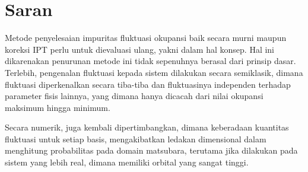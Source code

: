 \section{Saran}

Metode penyelesaian impuritas fluktuasi okupansi baik secara murni maupun koreksi IPT perlu untuk dievaluasi ulang, yakni dalam hal konsep. Hal ini dikarenakan penurunan metode ini tidak sepenuhnya berasal dari prinsip dasar. Terlebih, pengenalan fluktuasi kepada sistem dilakukan secara semiklasik, dimana fluktuasi diperkenalkan secara tiba-tiba dan fluktuasinya independen terhadap parameter fisis lainnya, yang dimana hanya dicacah dari nilai okupansi maksimum hingga minimum.

Secara numerik, juga kembali dipertimbangkan, dimana keberadaan kuantitas fluktuasi untuk setiap basis, mengakibatkan ledakan dimensional dalam menghitung probabilitas pada domain matsubara, terutama jika dilakukan pada sistem yang lebih real, dimana memiliki orbital yang sangat tinggi.